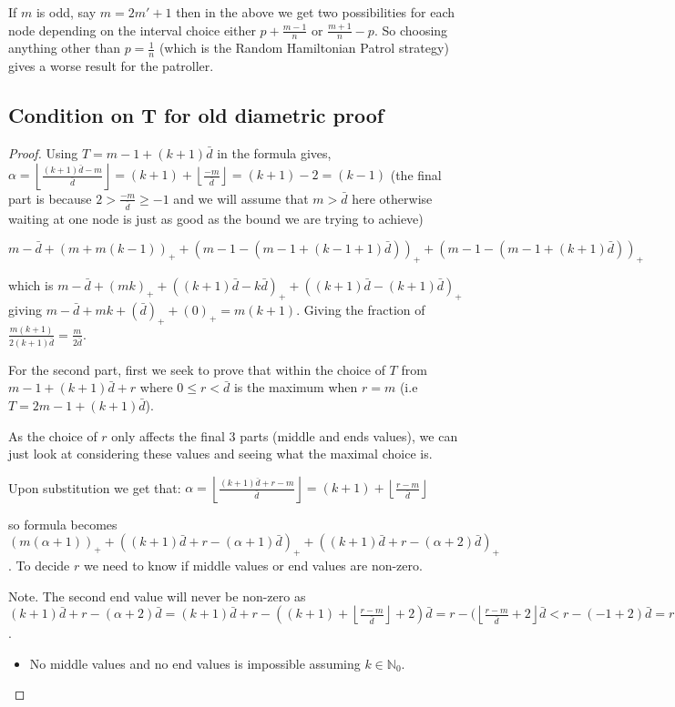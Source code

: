 \documentclass[a4paper,10pt]{article}
\newcommand{\floor}[1]{\left \lfloor #1 \right \rfloor}
\newcommand{\pospart}[1]{\left( #1 \right)_{+}}
\theoremstyle{definition}
\theoremstyle{definition}
\theoremstyle{remark}
\theoremstyle{definition}
\begin{document}
If $m$ is odd, say $m=2m'+1$ then in the above we get two possibilities for each node depending on the interval choice either $p+\frac{m-1}{n}$ or $\frac{m+1}{n}-p$. So choosing anything other than $p=\frac{1}{n}$ (which is the Random Hamiltonian Patrol strategy) gives a worse result for the patroller.

\subsection{Condition on T for old diametric proof}
\label{Condition on T for old diametric proof}

\begin{proof}
Using $T=m-1+(k+1)\bar{d}$ in the formula gives,
$\alpha=\floor{\frac{(k+1) \bar{d}-m}{\bar{d}}}=(k+1)+\floor{\frac{-m}{\bar{d}}}=(k+1)-2=(k-1)$ (the final part is because $2>\frac{-m}{\bar{d}} \geq -1$ and we will assume that $m > \bar{d}$ here otherwise waiting at one node is just as good as the bound we are trying to achieve)

$m-\bar{d}+\pospart{m + m(k-1)} + \pospart{m-1-(m-1+(k-1+1)\bar{d})}+\pospart{m-1-(m-1+(k+1)\bar{d})}$

which is $m-\bar{d}+\pospart{mk} + \pospart{(k+1)\bar{d}-k\bar{d}}+\pospart{(k+1)\bar{d}-(k+1)\bar{d}}$
giving $m-\bar{d}+mk+ \pospart{\bar{d}}+\pospart{0}=m(k+1)$.
Giving the fraction of $\frac{m(k+1)}{2(k+1)\bar{d}}=\frac{m}{2 \bar{d}}$.


For the second part, first we seek to prove that within the choice of $T$ from $m-1+(k+1)\bar{d}+r$ where $0 \leq r < \bar{d}$ is the maximum when $r=m$ (i.e $T=2m-1+(k+1)\bar{d}$).

As the choice of $r$ only affects the final 3 parts (middle and ends values), we can just look at considering these values and seeing what the maximal choice is.

Upon substitution we get that:
$\alpha=\floor{\frac{(k+1)\bar{d}+r-m}{\bar{d}}}=(k+1)+\floor{\frac{r-m}{\bar{d}}}$

so formula becomes
$\pospart{m(\alpha+1)}+\pospart{(k+1)\bar{d}+r-(\alpha+1)\bar{d}}+
\pospart{(k+1)\bar{d}+r-(\alpha+2)\bar{d}}$. To decide $r$ we need to know if middle values or end values are non-zero.

Note. The second end value will never be non-zero as $(k+1)\bar{d}+r-(\alpha+2)\bar{d}=(k+1)\bar{d}+r-((k+1)+\floor{\frac{r-m}{\bar{d}}}+2)\bar{d}=r-(\floor{\frac{r-m}{\bar{d}}+2}\bar{d} < r-(-1+2)\bar{d}=r-\bar{d}<0$.

\begin{itemize}
\item No middle values and no end values is impossible assuming $k \in \mathbb{N}_{0}$.


\end{itemize}
\end{proof}
\end{document}
